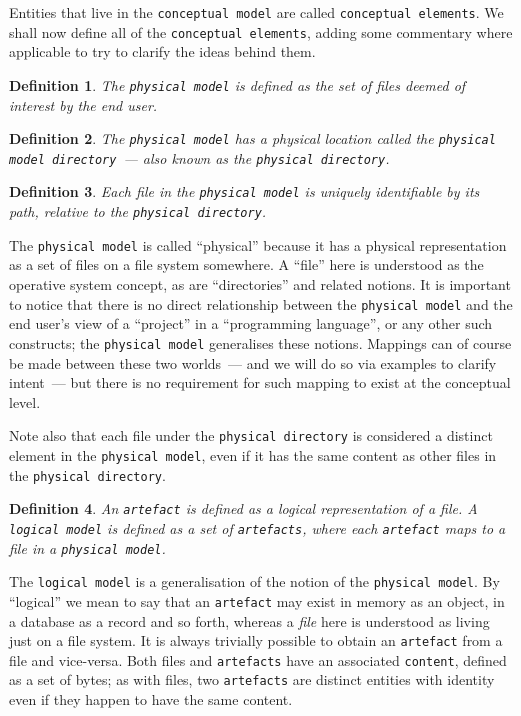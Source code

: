 \documentclass{book}
\newtheorem{concept}{Definition}
\begin{document}
Entities that live in the \texttt{conceptual model} are called
\texttt{conceptual elements}. We shall now define all of the
\texttt{conceptual elements}, adding some commentary where applicable
to try to clarify the ideas behind them.

\begin{concept}
  The \texttt{physical model} is defined as the set of files deemed of
  interest by the end user.
\end{concept}

\begin{concept}
  The \texttt{physical model} has a physical location called the
  \texttt{physical model directory}~--- also known as the
  \texttt{physical directory}.
\end{concept}

\begin{concept}
  Each file in the \texttt{physical model} is uniquely identifiable by
  its path, relative to the \texttt{physical directory}.
\end{concept}

The \texttt{physical model} is called ``physical'' because it has a
physical representation as a set of files on a file system
somewhere. A ``file'' here is understood as the operative system
concept, as are ``directories'' and related notions. It is important
to notice that there is no direct relationship between the
\texttt{physical model} and the end user's view of a ``project'' in a
``programming language'', or any other such constructs; the
\texttt{physical model} generalises these notions. Mappings can of
course be made between these two worlds~--- and we will do so via
examples to clarify intent~--- but there is no requirement for such
mapping to exist at the conceptual level.

Note also that each file under the \texttt{physical directory} is
considered a distinct element in the \texttt{physical model}, even if
it has the same content as other files in the \texttt{physical
  directory}.

\begin{concept}
  An \texttt{artefact} is defined as a logical representation of a
  file. A \texttt{logical model} is defined as a set of
  \texttt{artefacts}, where each \texttt{artefact} maps to a file in a
  \texttt{physical model}.
\end{concept}

The \texttt{logical model} is a generalisation of the notion of the
\texttt{physical model}. By ``logical'' we mean to say that an
\texttt{artefact} may exist in memory as an object, in a database as a
record and so forth, whereas a \emph{file} here is understood as
living just on a file system. It is always trivially possible to
obtain an \texttt{artefact} from a file and vice-versa. Both files and
\texttt{artefacts} have an associated \texttt{content}, defined as a
set of bytes; as with files, two \texttt{artefacts} are distinct
entities with identity even if they happen to have the same content.
\end{document}
